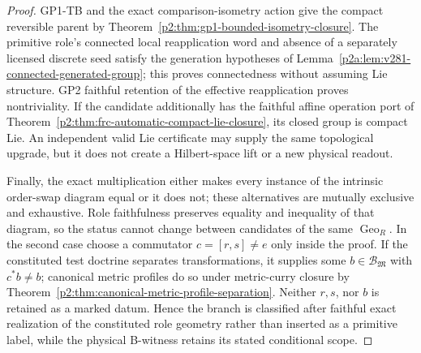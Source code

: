 \documentclass[12pt,a4paper]{article}
\begin{document}
\begin{proof}
GP1-TB and the exact comparison-isometry action give the compact
reversible parent by
Theorem~\ref{p2:thm:gp1-bounded-isometry-closure}.
The primitive role's connected local reapplication word and absence
of a separately licensed discrete seed satisfy the generation
hypotheses of
Lemma~\ref{p2a:lem:v281-connected-generated-group}; this proves
connectedness without assuming Lie structure.  GP2 faithful retention
of the effective reapplication proves nontriviality.
If the candidate additionally has the faithful affine operation port
of Theorem~\ref{p2:thm:frc-automatic-compact-lie-closure}, its closed
group is compact Lie.  An independent valid Lie certificate may
supply the same topological upgrade, but it does not create a
Hilbert-space lift or a new physical readout.

Finally, the exact multiplication either makes every instance of the intrinsic
order-swap diagram equal or it does not; these alternatives are mutually
exclusive and exhaustive.  Role faithfulness preserves equality and
inequality of that diagram, so the status cannot change between candidates of
the same \(\operatorname{Geo}_R\).  In the second case choose a commutator
\(c=[r,s]\ne e\) only inside the proof.  If the constituted test doctrine
separates transformations, it supplies some
\(b\in\mathcal B_{\mathfrak M}\) with \(c^*b\ne b\); canonical metric profiles
do so under metric-curry closure by
Theorem~\ref{p2:thm:canonical-metric-profile-separation}.  Neither \(r,s\), nor
\(b\) is retained as a marked datum.  Hence the branch is classified after
faithful exact realization of the constituted role geometry rather than
inserted as a primitive label, while the physical
B-witness retains its stated conditional scope.
\end{proof}
\end{document}
